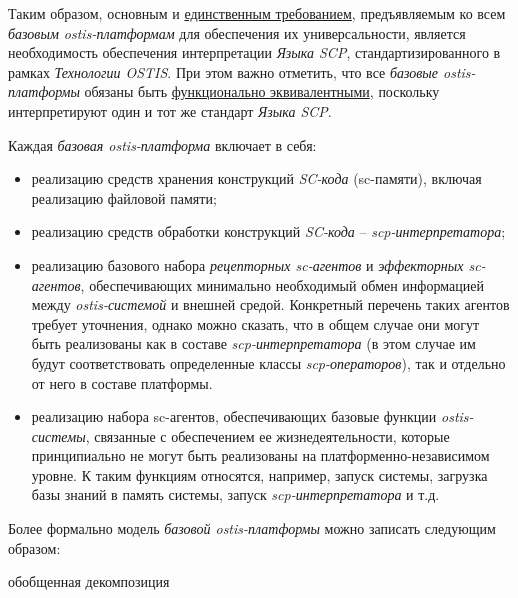 Таким образом, основным и \uline{единственным требованием}, предъявляемым ко всем \textit{базовым ostis-платформам} для обеспечения их универсальности, является необходимость обеспечения интерпретации \textit{Языка SCP}, стандартизированного в рамках \textit{Технологии OSTIS}. При этом важно отметить, что все \textit{базовые ostis-платформы} обязаны быть \uline{функционально эквивалентными}, поскольку интерпретируют один и тот же стандарт \textit{Языка SCP}.

Каждая \textit{базовая ostis-платформа} включает в себя:
\begin{itemize}
	\item реализацию средств хранения конструкций \textit{SC-кода} (sc-памяти), включая реализацию файловой памяти;
	\item реализацию средств обработки конструкций \textit{SC-кода} -- \textit{scp-интерпретатора};
	\item реализацию базового набора \textit{рецепторных sc-агентов} и \textit{эффекторных sc-агентов}, обеспечивающих минимально необходимый обмен информацией между \textit{ostis-системой} и внешней средой. Конкретный перечень таких агентов требует уточнения, однако можно сказать, что в общем случае они могут быть реализованы как в составе \textit{scp-интерпретатора} (в этом случае им будут соответствовать определенные классы \textit{scp-операторов}), так и отдельно от него в составе платформы.
	\item реализацию набора sc-агентов, обеспечивающих базовые функции \textit{ostis-системы}, связанные с обеспечением ее жизнедеятельности, которые принципиально не могут быть реализованы на платформенно-независимом уровне. К таким функциям относятся, например, запуск системы, загрузка базы знаний в память системы, запуск \textit{scp-интерпретатора} и т.д.
\end{itemize}

Более формально модель \textit{базовой ostis-платформы} можно записать следующим образом:

\begin{SCn}
\begin{scnrelfromset}{обобщенная декомпозиция}
	\begin{scnindent}
	\end{scnindent}
\end{scnrelfromset}
\end{SCn}

